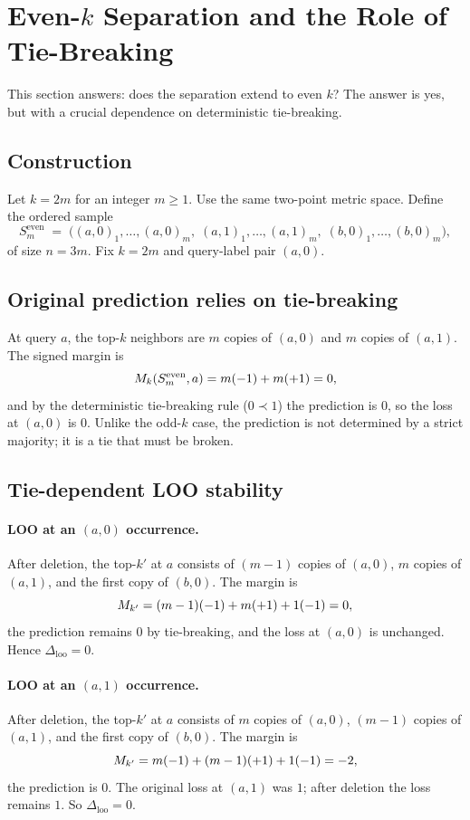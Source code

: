 \section{Even-$k$ Separation and the Role of Tie-Breaking}
\label{sec:even-k-separation}

This section answers: does the separation extend to even $k$?  The answer is
yes, but with a crucial dependence on deterministic tie-breaking.

\subsection{Construction}

Let $k = 2m$ for an integer $m \ge 1$.  Use the same two-point metric space.
Define the ordered sample
\[
S_m^{\text{even}} \;=\; \big((a,0)_1,\ldots,(a,0)_m,\;
                            (a,1)_1,\ldots,(a,1)_m,\;
                            (b,0)_1,\ldots,(b,0)_m\big),
\]
of size $n = 3m$.  Fix $k = 2m$ and query-label pair $(a,0)$.

\subsection{Original prediction relies on tie-breaking}

At query $a$, the top-$k$ neighbors are $m$ copies of $(a,0)$ and $m$ copies of
$(a,1)$.  The signed margin is
\[
M_k(S_m^{\text{even}}, a) = m(-1) + m(+1) = 0,
\]
and by the deterministic tie-breaking rule ($0 \prec 1$) the prediction is $0$,
so the loss at $(a,0)$ is $0$.  Unlike the odd-$k$ case, the prediction is not
determined by a strict majority; it is a tie that must be broken.

\subsection{Tie-dependent LOO stability}

\paragraph{LOO at an $(a,0)$ occurrence.}
After deletion, the top-$k'$ at $a$ consists of $(m-1)$ copies of $(a,0)$, $m$
copies of $(a,1)$, and the first copy of $(b,0)$.  The margin is
\[
M_{k'} = (m-1)(-1) + m(+1) + 1(-1) = 0,
\]
the prediction remains $0$ by tie-breaking, and the loss at $(a,0)$ is
unchanged.  Hence $\Delta_{\mathrm{loo}} = 0$.

\paragraph{LOO at an $(a,1)$ occurrence.}
After deletion, the top-$k'$ at $a$ consists of $m$ copies of $(a,0)$,
$(m-1)$ copies of $(a,1)$, and the first copy of $(b,0)$.  The margin is
\[
M_{k'} = m(-1) + (m-1)(+1) + 1(-1) = -2,
\]
the prediction is $0$.  The original loss at $(a,1)$ was $1$; after deletion
the loss remains $1$.  So $\Delta_{\mathrm{loo}} = 0$.

